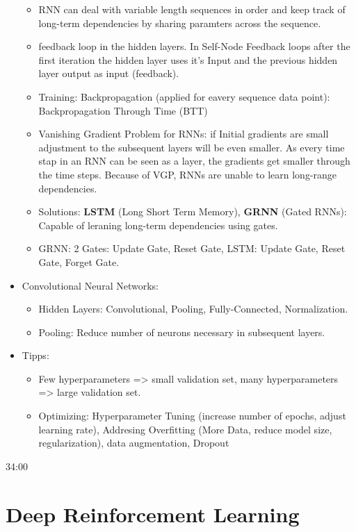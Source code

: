 \begin{itemize}[noitemsep,nolistsep]
\begin{itemize}[noitemsep,nolistsep]
		\item RNN can deal with variable length sequences in order and keep track of long-term dependencies by sharing paramters across the sequence.
		\item feedback loop in the hidden layers. In Self-Node Feedback loops after the first iteration the hidden layer uses it's Input and the previous hidden layer output as input (feedback).
		\item Training: Backpropagation (applied for eavery sequence data point): Backpropagation Through Time (BTT)
		\item Vanishing Gradient Problem for RNNs: if Initial gradients are small adjustment to the subsequent layers will be even smaller. As every time stap in an RNN can be seen as a layer, the gradients get smaller through the time steps. Because of VGP, RNNs are unable to learn long-range dependencies.
		\item Solutions: \textbf{LSTM} (Long Short Term Memory), \textbf{GRNN} (Gated RNNs): Capable of leraning long-term dependencies using gates.
		\item GRNN: 2 Gates: Update Gate, Reset Gate, LSTM: Update Gate, Reset Gate, Forget Gate.
	\end{itemize}
	\item Convolutional Neural Networks:
	\begin{itemize}[noitemsep,nolistsep]
		\item Hidden Layers: Convolutional, Pooling, Fully-Connected, Normalization.
		\item Pooling: Reduce number of neurons necessary in subsequent layers.
	\end{itemize}
	\item Tipps:
	\begin{itemize}[noitemsep,nolistsep]
		\item Few hyperparameters => small validation set, many hyperparameters => large validation set.
		\item Optimizing: Hyperparameter Tuning (increase number of epochs, adjust learning rate), Addresing Overfitting (More Data, reduce model size, regularization), data augmentation, Dropout
	\end{itemize}
\end{itemize}
34:00

\section{Deep Reinforcement Learning}
